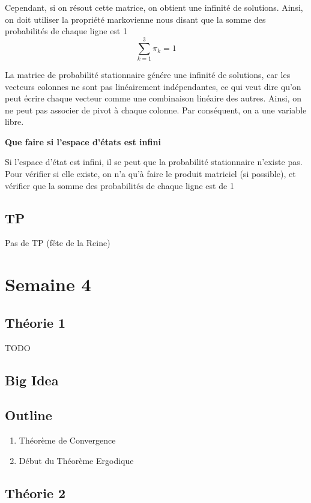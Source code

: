 \documentclass{article}
\begin{document}
Cependant, si on résout cette matrice, on obtient une infinité de solutions.
Ainsi, on doit utiliser la propriété markovienne nous disant que la somme des
probabilités de chaque ligne est 1
$$ \sum^{3}_{k=1} \pi _k = 1$$

\begin{remark}
    La matrice de probabilité stationnaire génére une infinité de solutions,
    car les vecteurs colonnes ne sont pas linéairement indépendantes, ce qui
    veut dire qu'on peut écrire chaque vecteur comme une combinaison linéaire
    des autres. Ainsi, on ne peut pas associer de pivot à chaque colonne. Par
    conséquent, on a une variable libre.
\end{remark}

\textbf{Que faire si l'espace d'états est infini}

Si l'espace d'état est infini, il se peut que la probabilité stationnaire
n'existe pas. Pour vérifier si elle existe, on n'a qu'à faire le produit
matriciel (si possible), et vérifier que la somme des probabilités de chaque
ligne est de 1

\subsection{TP}

Pas de TP (fête de la Reine)

\pagebreak
\section{Semaine 4}
\subsection{Théorie 1}
TODO
\subsection*{Big Idea}
\subsection*{Outline}
\begin{enumerate}
    \item Théorème de Convergence
    \item Début du Théorème Ergodique
\end{enumerate}
\subsection{Théorie 2}
\end{document}
